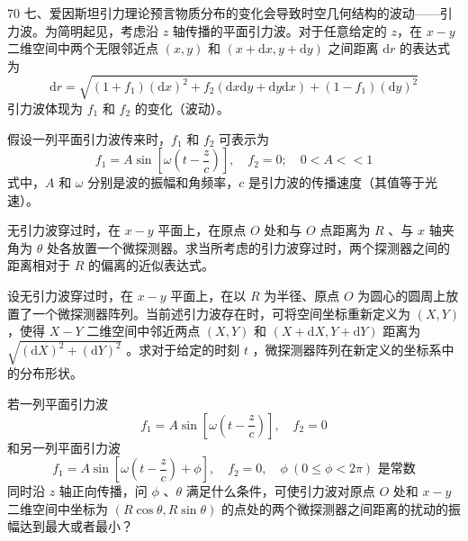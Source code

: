 \begin{problem}[33届物理竞赛决赛]{70}
    七、爱因斯坦引力理论预言物质分布的变化会导致时空几何结构的波动——引力波。为简明起见，考虑沿 $z$ 轴传播的平面引力波。对于任意给定的 $z$，在 $x-y$ 二维空间中两个无限邻近点 $(x,y)$ 和 $(x+\mathrm{d}x,y+\mathrm{d}y)$ 之间距离 $\mathrm{d}r$ 的表达式为
    \begin{equation*}
        \mathrm{d}r = \sqrt{(1+f_{1})(\mathrm{d}x)^{2} + f_{2}(\mathrm{d}x\mathrm{d}y + \mathrm{d}y\mathrm{d}x) + (1-f_{1})(\mathrm{d}y)^{2}}
    \end{equation*}
    引力波体现为 $f_{1}$ 和 $f_{2}$ 的变化（波动）。
    \begin{subproblem}
        假设一列平面引力波传来时，$f_{1}$ 和 $f_{2}$ 可表示为
        \begin{equation*}
            f_{1} = A\sin[\omega(t - \frac{z}{c})],\quad f_{2} = 0;\quad 0 < A << 1
        \end{equation*}
        式中，$A$ 和 $\omega$ 分别是波的振幅和角频率，$c$ 是引力波的传播速度（其值等于光速）。
        \begin{subsubproblem}
            无引力波穿过时，在 $x-y$ 平面上，在原点 $O$ 处和与 $O$ 点距离为 $R$ 、与 $x$ 轴夹角为 $\theta$ 处各放置一个微探测器。求当所考虑的引力波穿过时，两个探测器之间的距离相对于 $R$ 的偏离的近似表达式。
        \end{subsubproblem}
        \begin{subsubproblem}
            设无引力波穿过时，在 $x-y$ 平面上，在以 $R$ 为半径、原点 $O$ 为圆心的圆周上放置了一个微探测器阵列。当前述引力波存在时，可将空间坐标重新定义为 $(X,Y)$ ，使得 $X-Y$ 二维空间中邻近两点 $(X,Y)$ 和 $(X+\mathrm{d}X,Y+\mathrm{d}Y)$ 距离为 $\sqrt{(\mathrm{d}X)^{2}+(\mathrm{d}Y)^{2}}$ 。求对于给定的时刻 $t$ ，微探测器阵列在新定义的坐标系中的分布形状。
        \end{subsubproblem}
        \begin{subsubproblem}
            若一列平面引力波
            \begin{equation*}
                f_{1} = A\sin[\omega(t - \frac{z}{c})],\quad f_{2} = 0
            \end{equation*}
            和另一列平面引力波
            \begin{equation*}
                f_{1} = A\sin[\omega(t - \frac{z}{c}) + \phi],\quad f_{2} = 0,\quad \phi\ (0 \leq \phi < 2\pi) \text{ 是常数}
            \end{equation*}
            同时沿 $z$ 轴正向传播，问 $\phi$ 、$\theta$ 满足什么条件，可使引力波对原点 $O$ 处和 $x-y$ 二维空间中坐标为 $(R\cos\theta, R\sin\theta)$ 的点处的两个微探测器之间距离的扰动的振幅达到最大或者最小？

\end{subsubproblem}
\end{subproblem}
\end{problem}
